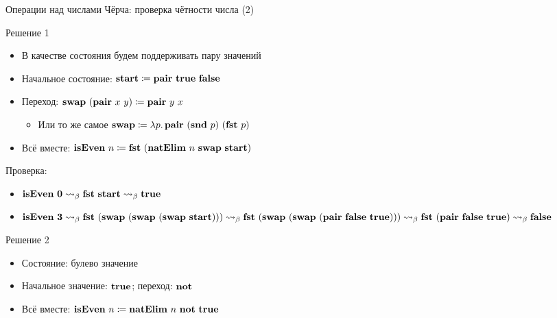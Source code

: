     \begin{frame}{Операции над числами Чёрча: проверка чётности числа (2)}
        \vspace{-0.7em}
        \begin{block}{Решение 1}
            \begin{itemize}
                \item В качестве состояния будем поддерживать пару значений
                \item Начальное состояние: $\mathbf{start} \coloneqq \mathbf{pair} ~ \mathbf{true} ~ \mathbf{false}$
                \item Переход:  $\mathbf{swap}  ~ (\mathbf{pair} ~ x ~ y) \coloneqq \mathbf{pair} ~ y ~ x$
                \begin{itemize}
                    \item  Или то же самое $\mathbf{swap} \coloneqq \lambda p\ldotp \mathbf{pair} ~ (\mathbf{snd} ~ p) ~ (\mathbf{fst} ~ p)$
                \end{itemize}
                \item  Всё вместе:  $\mathbf{isEven} ~ n \coloneqq  \mathbf{fst} ~ (\mathbf{natElim} ~ n ~ \mathbf{swap} ~ \mathbf{start})$
            \end{itemize}
            \pause
            Проверка:
            \begin{itemize}
                \item $\mathbf{isEven} ~ \mathbf{0} \rightsquigarrow_\beta  \mathbf{fst} ~ \mathbf{start} \rightsquigarrow_\beta \mathbf{true}$
                \item  $\mathbf{isEven} ~ \mathbf{3} \rightsquigarrow_\beta  \mathbf{fst} ~ (\mathbf{swap} ~ (\mathbf{swap} ~ (\mathbf{swap} ~ \mathbf{start}))) \rightsquigarrow_\beta   \mathbf{fst} ~ (\mathbf{swap} ~ (\mathbf{swap} ~ (\mathbf{pair} ~ \mathbf{false} ~ \mathbf{true}))) \rightsquigarrow_\beta  \mathbf{fst} ~ (\mathbf{pair} ~ \mathbf{false} ~ \mathbf{true}) \rightsquigarrow_\beta  \mathbf{false}$
            \end{itemize}
        \end{block}
        \vspace{-0.5em}
        \pause
        \begin{block}{Решение 2}
            \begin{itemize}
                \item Состояние: булево значение
                \item Начальное значение: $\mathbf{true}$; переход: $\mathbf{not}$
                \item Всё вместе: $\mathbf{isEven} ~ n \coloneqq \mathbf{natElim} ~ n ~ \mathbf{not} ~ \mathbf{true}$
            \end{itemize}
        \end{block}
    \end{frame}



